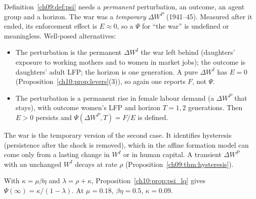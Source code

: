 \documentclass[../solutions_manual.tex]{subfiles}
\begin{document}
 Definition~\ref{ch09:def:psi} needs a \emph{permanent} perturbation, an outcome, an agent group and a horizon. The war was a \emph{temporary} $\Delta W^P$ (1941--45). Measured after it ended, its enforcement effect is $E \approx 0$, so a $\Psi$ for ``the war'' is undefined or meaningless. Well-posed alternatives:
\begin{itemize}
\item The perturbation is the permanent $\Delta W^I$ the war left behind (daughters' exposure to working mothers and to women in market jobs); the outcome is daughters' adult LFP; the horizon is one generation. A pure $\Delta W^I$ has $E = 0$ (Proposition~\ref{ch10:prop:levers}(3)), so again one reports $F$, not $\Psi$.
\item The perturbation is a permanent rise in female labour demand (a $\Delta W^P$ that stays), with outcome women's LFP and horizon $T = 1, 2$ generations. Then $E > 0$ persists and $\Psi(\Delta W^P, T) = F/E$ is defined.
\end{itemize}
The war is the temporary version of the second case. It identifies hysteresis (persistence after the shock is removed), which in the affine formation model can come only from a lasting change in $W^I$ or in human capital. A transient $\Delta W^P$ with an unchanged $W^I$ decays at rate $\rho$ (Proposition~\ref{ch09:thm:hysteresis}).

With $\kappa = \mu\beta\eta$ and $\lambda = \rho + \kappa$, Proposition~\ref{ch10:prop:psi_lq} gives $\Psi(\infty) = \kappa/(1 - \lambda)$. At $\mu = 0.18$, $\beta\eta = 0.5$, $\kappa = 0.09$.
\end{document}
